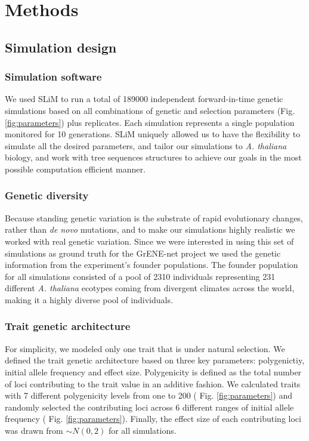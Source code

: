 \documentclass{article}
\begin{document}
\section{Methods}

\subsection{Simulation design}
\subsubsection{Simulation software}
We used SLiM \citep{Haller2019-oj} to run a total of 189000 independent forward-in-time genetic simulations based on all combinations of genetic and selection parameters (Fig. \ref{fig:parameters}) plus replicates. Each simulation represents a single population monitored for 10 generations. SLiM uniquely allowed us to have the flexibility to simulate all the desired parameters, and tailor our simulations to \textit{A. thaliana} biology, and work with tree sequences structures to achieve our goals in the most possible computation efficient manner.

\subsubsection{Genetic diversity}
Because standing genetic variation is the substrate of rapid evolutionary changes, rather than \textit{de novo} mutations, and to make our simulations highly realistic we worked with real genetic variation. Since we were interested in using this set of simulations as ground truth for the GrENE-net project we used the genetic information from the experiment's founder populations. The founder population for all simulations consisted of a pool of 2310 individuals representing 231 different \textit{A. thaliana} ecotypes coming from divergent climates across the world, making it a highly diverse pool of individuals. 

\subsubsection{Trait genetic architecture}
For simplicity, we modeled only one trait that is under natural selection. We defined the trait genetic architecture based on three key parameters: polygenictiy, initial allele frequency and effect size. Polygenicity is defined as the total number of loci contributing to the trait value in an additive fashion. We calculated traits with 7 different polygenicity levels from one to 200 ( Fig. \ref{fig:parameters}) and randomly selected the contributing loci across 6 different ranges of initial allele frequency ( Fig. \ref{fig:parameters}). Finally, the effect size of each contributing loci was drawn from \( \sim N(0, 2) \) for all simulations.
\end{document}
